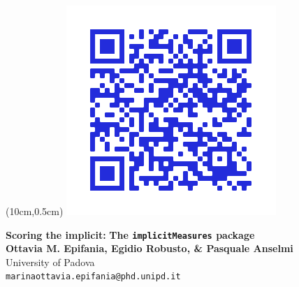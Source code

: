 \documentclass[a0,landscape]{a0poster}
\begin{document}


\begin{minipage}[b]{\linewidth}
	\begin{textblock*}{12cm}(10cm,0.5cm)
		\includegraphics[width=\linewidth]{implicitMeasures.png}\\
	\end{textblock*}
	
	\begin{center}
\veryHuge \textcolor{title}{\textbf{Scoring the implicit:}}
\veryHuge\textcolor{title}{\textbf{The \texttt{implicitMeasures} package}}\\[2cm] %

\LARGE \textbf{Ottavia M. Epifania, Egidio Robusto, \& Pasquale Anselmi}\\[0.5cm] %
\Large University of Padova\\[0.4cm] %
\Large \texttt{marinaottavia.epifania@phd.unipd.it}\\	
	\end{center}


\end{minipage}
\end{document}
